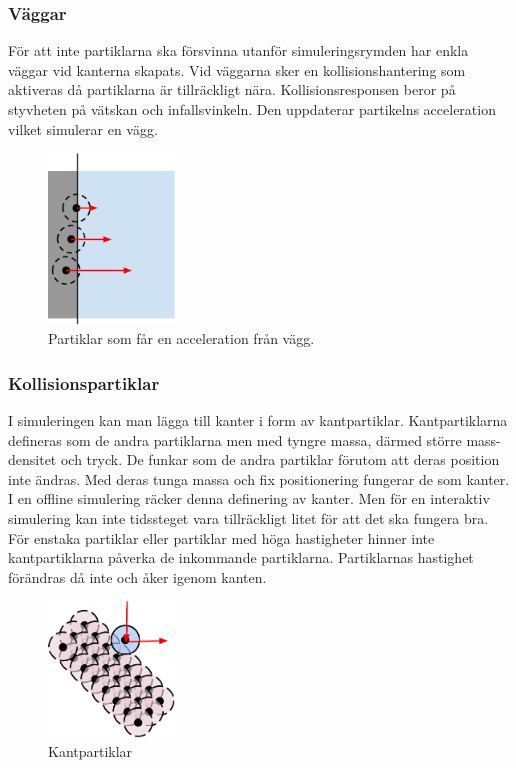 \documentclass[a4paper,12pt,oneside,final]{extarticle}
\begin{document}
\subsubsection{Väggar}
För att inte partiklarna ska försvinna utanför simuleringsrymden har enkla väggar vid kanterna skapats.
Vid väggarna sker en kollisionshantering som aktiveras då partiklarna är tillräckligt nära.
Kollisionsresponsen beror på styvheten på vätskan och infallsvinkeln.
Den uppdaterar partikelns acceleration vilket simulerar en vägg.
\begin{figure}[H]
  \centering
    \includegraphics[width=0.3\textwidth]{bilder/partiklar_vagg}
  \caption{Partiklar som får en acceleration från vägg.}
\end{figure}

\subsubsection{Kollisionspartiklar}
I simuleringen kan man lägga till kanter i form av kantpartiklar.
Kantpartiklarna defineras som de andra partiklarna men med tyngre massa, därmed större mass-densitet och tryck.
De funkar som de andra partiklar förutom att deras position inte ändras.
Med deras tunga massa och fix positionering fungerar de som kanter.
I en offline simulering räcker denna definering av kanter.
Men för en interaktiv simulering kan inte tidssteget vara tillräckligt litet för att det ska fungera bra.
För enstaka partiklar eller partiklar med höga hastigheter hinner inte kantpartiklarna påverka de inkommande partiklarna.
Partiklarnas hastighet förändras då inte och åker igenom kanten. 

\begin{figure}[H]
  \centering
    \includegraphics[width=0.3\textwidth]{bilder/partiklar_kolpart}
  \caption{Kantpartiklar}
\end{figure}
\end{document}
